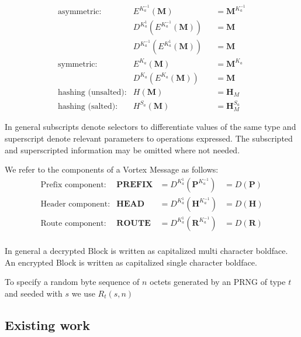 \documentclass[10pt,journal,compsoc]{IEEEtran}
\begin{document}
\begin{align*}
\text{asymmetric:}         & E^{K^{-1}_a}\left(\mathbf{M}\right)                        	&& =\mathbf{M}^{K^{-1}_a}\\
& D^{K^{1}_a}\left(E^{K^{-1}_a}\left(\mathbf{M}\right)\right)	&& =\mathbf{M}\\
& D^{K^{-1}_a}\left(E^{K^{1}_a}\left(\mathbf{M}\right)\right)	&& =\mathbf{M}\\
\text{symmetric:}          & E^{K_a}\left(\mathbf{M}\right)                             	&& =\mathbf{M}^{K_a}\\
& D^{K_a}\left(E^{K_a}\left(\mathbf{M}\right)\right)          && =\mathbf{M}\\
\text{hashing (unsalted):}& H\left(\mathbf{M}\right)                                   	&& =\mathbf{H}_M\\
\text{hashing (salted):}  & H^{S_a}\left(\mathbf{M}\right)                             	&& =\mathbf{H}^{S_a}_M
\end{align*}

In general subscripts denote selectors to differentiate values of the same type and superscript denote relevant parameters to operations expressed. The subscripted and superscripted information may be omitted where not needed.

We refer to the components of a Vortex Message as follows:
\begin{align*}
\text{Prefix component:}         & \mathbf{PREFIX}             	&=D^{K^{1}_a}\left(\mathbf{P}^{K^{-1}_a}\right) &=D\left(\mathbf{P}\right)\\
\text{Header component:}         & \mathbf{HEAD}             	&=D^{K^{1}_a}\left(\mathbf{H}^{K^{-1}_a}\right) &=D\left(\mathbf{H}\right)\\
\text{Route component:}         & \mathbf{ROUTE}             	&=D^{K^{1}_a}\left(\mathbf{R}^{K^{-1}_a}\right) &=D\left(\mathbf{R}\right)\\
\end{align*}

In general a decrypted Block is written as capitalized multi character boldface. An encrypted Block is written as capitalized single character boldface.

To specify a random byte sequence of $n$ octets generated by an PRNG of type $t$ and seeded with $s$ we use $R_t\left(s,n\right)$

\subsection{Existing work}
\end{document}
